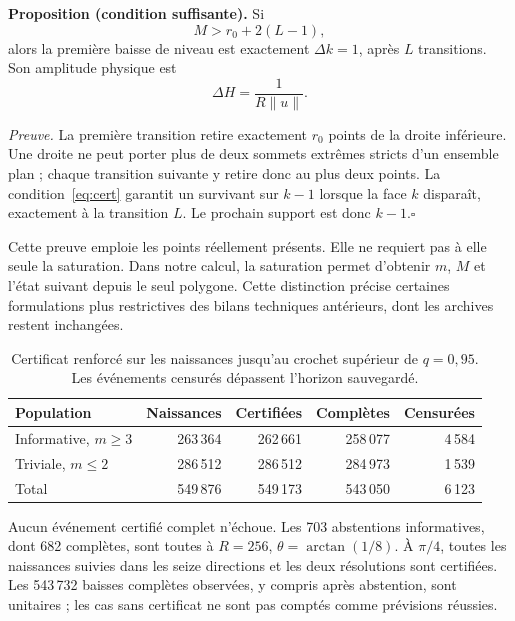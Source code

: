 \documentclass[11pt,a4paper]{article}
\begin{document}
\textbf{Proposition (condition suffisante).} Si
\begin{equation}\label{eq:cert}M>r_0+2(L-1),\end{equation}
alors la première baisse de niveau est exactement $\Delta k=1$, après $L$ transitions. Son amplitude physique est
\begin{equation}\Delta H=\frac{1}{R\|u\|}.\end{equation}

\textit{Preuve.} La première transition retire exactement $r_0$ points de la droite inférieure. Une droite ne peut porter plus de deux sommets extrêmes stricts d'un ensemble plan ; chaque transition suivante y retire donc au plus deux points. La condition~\eqref{eq:cert} garantit un survivant sur $k-1$ lorsque la face $k$ disparaît, exactement à la transition $L$. Le prochain support est donc $k-1$.\hfill$\square$

Cette preuve emploie les points réellement présents. Elle ne requiert pas à elle seule la saturation. Dans notre calcul, la saturation permet d'obtenir $m$, $M$ et l'état suivant depuis le seul polygone. Cette distinction précise certaines formulations plus restrictives des bilans techniques antérieurs, dont les archives restent inchangées.

\begin{table}[h]\centering\small
\caption{Certificat renforcé sur les naissances jusqu'au crochet supérieur de $q=0{,}95$. Les événements censurés dépassent l'horizon sauvegardé.}
\begin{tabular}{lrrrr}\toprule
Population & Naissances & Certifiées & Complètes & Censurées\\\midrule
Informative, $m\ge3$ & 263\,364 & 262\,661 & 258\,077 & 4\,584\\
Triviale, $m\le2$ & 286\,512 & 286\,512 & 284\,973 & 1\,539\\
Total & 549\,876 & 549\,173 & 543\,050 & 6\,123\\\bottomrule
\end{tabular}
\end{table}

Aucun événement certifié complet n'échoue. Les 703 abstentions informatives, dont 682 complètes, sont toutes à $R=256$, $\theta=\arctan(1/8)$. À $\pi/4$, toutes les naissances suivies dans les seize directions et les deux résolutions sont certifiées. Les 543\,732 baisses complètes observées, y compris après abstention, sont unitaires ; les cas sans certificat ne sont pas comptés comme prévisions réussies.
\end{document}
